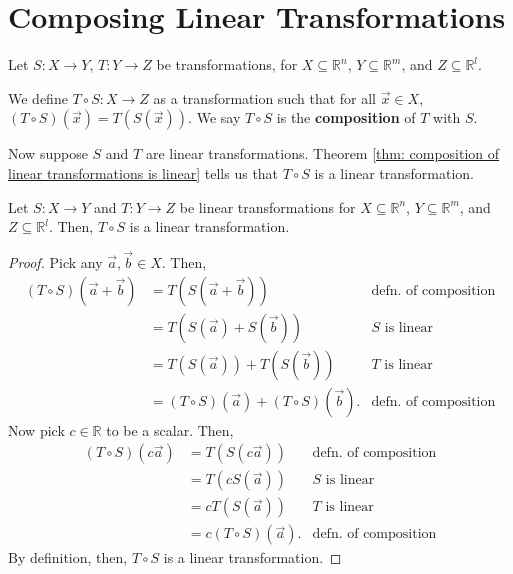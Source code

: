 \documentclass[]{book}
\newcommand{\R}{\ensuremath{\mathbb{R}}}
\begin{document}
\section{Composing Linear Transformations}
Let $S:X \to Y$, $T: Y \to Z$ be transformations, for $X \subseteq \R^n$, $Y\subseteq \R^m$, and $Z \subseteq \R^l$.
\begin{definition}
    We define $T \circ S: X \to Z$ as a transformation such that for all $\vec{x} \in X$, $(T \circ S)(\vec{x}) = T\left(S\left(\vec{x}\right)\right)$. We say $T \circ S$ is the \textbf{composition} of $T$ with $S$.
\end{definition}
Now suppose $S$ and $T$ are linear transformations. Theorem \ref{thm: composition of linear transformations is linear} tells us that $T \circ S$ is a linear transformation.
\begin{theorem}
    \label{thm: composition of linear transformations is linear}
    Let $S:X \to Y$ and $T: Y \to Z$ be linear transformations for $X \subseteq \R^n$, $Y \subseteq \R^m$, and $Z \subseteq \R^l$. Then, $T \circ S$ is a linear transformation.
\begin{proof}
    Pick any $\vec{a},\vec{b} \in X$. Then,
    \begin{align*}
        \left(T \circ S\right)\left(\vec{a} + \vec{b}\right) &= T\left(S\left(\vec{a} + \vec{b}\right)\right) & \text{defn. of composition} \\
        &= T\left(S\left(\vec{a}\right) + S\left(\vec{b}\right)\right) & \text{$S$ is linear} \\
        &= T\left(S\left(\vec{a}\right)\right) + T\left(S\left(\vec{b}\right)\right) & \text{$T$ is linear} \\
        &= \left(T\circ S\right)\left(\vec{a}\right) + \left(T\circ S\right)\left(\vec{b}\right). & \text{defn. of composition}
    \end{align*}
    Now pick $c \in \R$ to be a scalar. Then,
    \begin{align*}
        \left(T \circ S\right)\left(c\vec{a}\right) &= T\left(S\left(c\vec{a}\right)\right) & \text{defn. of composition} \\
        &= T\left(cS\left(\vec{a}\right)\right) & \text{$S$ is linear} \\
        &= cT\left(S\left(\vec{a}\right)\right) & \text{$T$ is linear} \\
        &= c\left(T \circ S\right)\left(\vec{a}\right). & \text{defn. of composition}
    \end{align*}
    By definition, then, $T \circ S$ is a linear transformation.
\end{proof}
\end{theorem}
\end{document}
